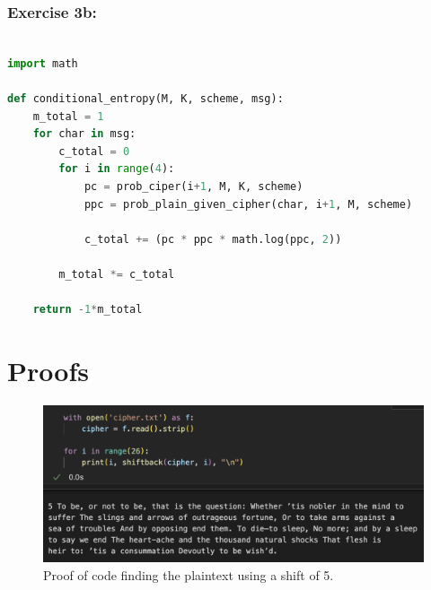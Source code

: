 \documentclass[10pt, oneside]{article}
\begin{document}
\subsubsection{Exercise 3b:}
\label{3b-code}
\begin{lstlisting}[language=Python]

import math

def conditional_entropy(M, K, scheme, msg):
    m_total = 1
    for char in msg:
        c_total = 0
        for i in range(4):
            pc = prob_ciper(i+1, M, K, scheme)
            ppc = prob_plain_given_cipher(char, i+1, M, scheme)
    
            c_total += (pc * ppc * math.log(ppc, 2))
    
        m_total *= c_total
    
    return -1*m_total
\end{lstlisting}

\section{Proofs}

\begin{figure}[h!]
    \centering
    \includegraphics[scale=0.5]{img/caeser.png}
    \caption{Proof of code finding the plaintext using a shift of 5.}
    \label{caesarproof}
\end{figure}
\end{document}
